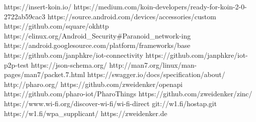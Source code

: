 \documentclass[12pt,a4paper]{article}
\begin{document}
\begin{thebibliography}{10}
		https://insert-koin.io/
		https://medium.com/koin-developers/ready-for-koin-2-0-2722ab59cac3
        https://source.android.com/devices/accessories/custom
        https://github.com/square/okhttp
        https://elinux.org/Android\_Security\#Paranoid\_network-ing
        https://android.googlesource.com/platform/frameworks/base
        https://github.com/janphkre/iot-connectivity
        https://github.com/janphkre/iot-p2p-test
        https://json-schema.org/
        http://man7.org/linux/man-pages/man7/packet.7.html
        https://swagger.io/docs/specification/about/
        http://pharo.org/
        https://github.com/zweidenker/openapi
        https://github.com/pharo-iot/PharoThings
        https://github.com/zweidenker/zinc/
        https://www.wi-fi.org/discover-wi-fi/wi-fi-direct                        		git://w1.fi/hostap.git
        https://w1.fi/wpa\_supplicant/
        https://zweidenker.de
    \end{thebibliography}
\end{document}
